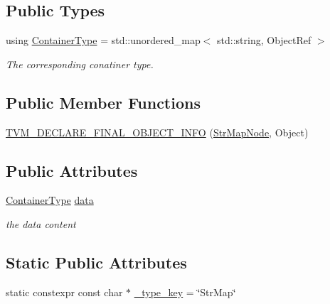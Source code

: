 \subsection*{Public Types}
\begin{DoxyCompactItemize}
\item 
using \hyperlink{classtvm_1_1StrMapNode_aecbcb8cc7967c9f4734621e7e6959a77}{Container\+Type} = std\+::unordered\+\_\+map$<$ std\+::string, Object\+Ref $>$
\begin{DoxyCompactList}\small\item\em The corresponding conatiner type. \end{DoxyCompactList}\end{DoxyCompactItemize}
\subsection*{Public Member Functions}
\begin{DoxyCompactItemize}
\item 
\hyperlink{classtvm_1_1StrMapNode_a856676bfa3e57e0679cf4a1b010c22e3}{T\+V\+M\+\_\+\+D\+E\+C\+L\+A\+R\+E\+\_\+\+F\+I\+N\+A\+L\+\_\+\+O\+B\+J\+E\+C\+T\+\_\+\+I\+N\+FO} (\hyperlink{classtvm_1_1StrMapNode}{Str\+Map\+Node}, Object)
\end{DoxyCompactItemize}
\subsection*{Public Attributes}
\begin{DoxyCompactItemize}
\item 
\hyperlink{classtvm_1_1StrMapNode_aecbcb8cc7967c9f4734621e7e6959a77}{Container\+Type} \hyperlink{classtvm_1_1StrMapNode_a2e0d7690f35ec6f99f850724c81e841f}{data}
\begin{DoxyCompactList}\small\item\em the data content \end{DoxyCompactList}\end{DoxyCompactItemize}
\subsection*{Static Public Attributes}
\begin{DoxyCompactItemize}
\item 
static constexpr const char $\ast$ \hyperlink{classtvm_1_1StrMapNode_accfa1041faca61e5ef9d77bbf3d73acb}{\+\_\+type\+\_\+key} = \char`\"{}Str\+Map\char`\"{}
\end{DoxyCompactItemize}


